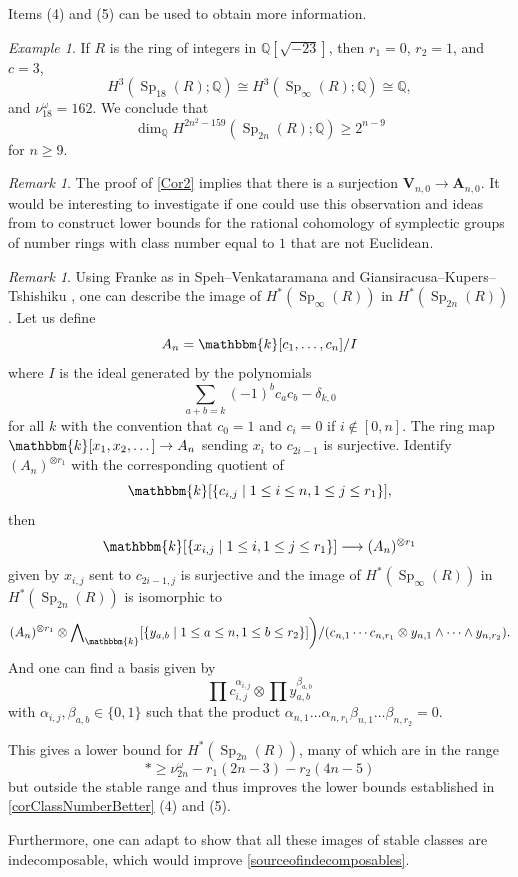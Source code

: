 \documentclass[11pt,letterpaper]{amsart}
\newcommand{\bk}{\mathbbm{k}}
\DeclareMathOperator{\Sp}{Sp}
\newcommand{\VV}{\mathbf{V}}
\newcommand{\HA}{\mathbf{A}}
\newcommand{\bQ}{\mathbb{Q}}\newcommand{\bR}{\mathbb{R}}
\newcommand{\Q}{\mathbb{Q}}
\numberwithin{theoremcounter}{section}
\theoremstyle{definition}
\theoremstyle{remark}
\newtheorem{example}[exampleauto]{Example}
\newtheorem{remark}[remarkauto]{Remark}
\begin{document}
Items (4) and (5) can be used to obtain more information.  

\begin{example} \label{codim96}
     If $R$ is the ring of integers in $\Q[\sqrt{-23}]$, then $r_1=0$, $r_2=1$, and $c=3$, $$H^3(\Sp_{18}(R);\bQ) \cong H^3(\Sp_{\infty}(R);\bQ) \cong \Q,$$ and $\nu^\omega_{18}=162$. We conclude that  
$$\dim_\Q H^{2n^2-159}(\Sp_{2n}(R);\Q) \geq 2^{n-9}$$ for $n \geq 9$.
\end{example}

\begin{remark}
 The proof of  \autoref{Cor2} implies that there is a surjection $\VV_{n,0} \to \HA_{n,0}$. It would be interesting to investigate if one could use this observation and ideas from \cite{MPWY} to construct lower bounds for the rational cohomology of symplectic groups of number rings with class number equal to $1$ that are not Euclidean.
\end{remark}

\begin{remark}\label{FrankeRem}
    Using Franke \cite[Section 7]{Franke} as in Speh--Venkataramana \cite[Section 4]{SpehVenk} and  Giansiracusa--Kupers--Tshishiku \cite[Theorem 13]{BenaSanderJeff}, one can describe the image of $H^*(\Sp_\infty (R))$ in $H^*(\Sp_{2n}(R))$. Let us define 
    \[ A_n = \bk[c_1,\dots,c_n]/I\]
    where $I$ is the ideal generated by the polynomials
    \[ \sum_{a+b = k} (-1)^b c_ac_b -\delta_{k,0}\]
    for all $k$ with the convention that $c_0=1$ and $c_i=0$ if $i \not\in[0,n].$
    The ring map $\bk[x_1,x_2,\dots]\to A_n$ sending $x_i$ to $c_{2i-1}$ is surjective. Identify $(A_n)^{\otimes r_1}$ with the corresponding quotient of 
    \[\bk[\{c_{i,j} \mid 1\le i \le n, 1 \le j \le r_1\}],\]
    then 
    \[\bk[\{x_{i,j} \mid 1\le i, 1\le j \le r_1\}]  \longrightarrow (A_n)^{\otimes r_1}\]
    given by $x_{i,j}$ sent to $c_{2i-1,j}$ is surjective and
    the image of $H^*(\Sp_\infty (R))$ in $H^*(\Sp_{2n}(R))$ is isomorphic to
    \[ (A_n)^{\otimes r_1} \otimes {\bigwedge}_{\bk}[\{y_{a,b}\mid 1\le a\le n, 1\le b \le r_2 \}]\bigg)/ (c_{n,1} \cdots c_{n,r_1} \otimes y_{n,1} \wedge \dots \wedge y_{n,r_2}).\]
    And one can find a basis given by 
    \[ \prod c_{i,j}^{\alpha_{i,j}} \otimes \prod y_{a,b}^{\beta_{a,b}}\]
    with $\alpha_{i,j},\beta_{a,b} \in \{0,1\}$ such that the product $\alpha_{n,1}\dots \alpha_{n,r_1}\beta_{n,1} \dots\beta_{n,r_2} = 0$.

    This gives a lower bound for $H^*(\Sp_{2n}(R))$, many of which are in the range 
    $$*\ge \nu^\omega_{2n}-  r_1(2n-3) - r_2(4n-5)$$
    but outside the stable range and thus improves the lower bounds established in \autoref{corClassNumberBetter} (4) and (5).

    Furthermore, one can adapt \cite[Proof of Theorem 1.2 in Section 4.2]{BCGP} to show that all these images of stable classes are indecomposable, which would improve \autoref{sourceofindecomposables}.
\end{remark}
\end{document}
